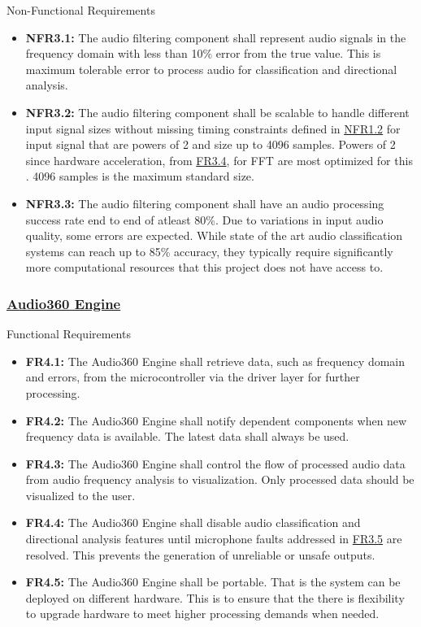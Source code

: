 \documentclass[12pt]{article}
\theoremstyle{definition}
\begin{document}
Non-Functional Requirements
\begin{itemize}
  \item \label{NFR3_1}\textbf{NFR3.1:} The audio filtering component shall
  represent audio signals in the frequency domain with less than 10\% error from
  the true value. This is maximum tolerable error to process audio for
  classification and directional analysis.
  \item \label{NFR3_2}\textbf{NFR3.2:} The audio filtering component shall be
  scalable to handle different input signal sizes without missing timing
  constraints defined in \hyperref[NFR1_2]{NFR1.2} for input signal that are
  powers of 2 and size up to 4096 samples. Powers of 2 since 
  hardware acceleration, from \hyperref[FR3_4]{FR3.4}, for FFT are most
  optimized for this \cite{CMSIS_DSP_FFT}. 4096 samples is the maximum standard
  size.

  \item \label{NFR3_3}\textbf{NFR3.3:} The audio filtering component shall have
  an audio processing success rate end to end of atleast 80\%.
  Due to variations in input audio quality, some errors are expected.
  While state of the art audio classification systems can reach up to 85\%
  accuracy, they typically require significantly more computational resources
  that this project does not have access to.

\end{itemize}

\subsubsection{\hyperref[comp:audio360Engine]{Audio360 Engine}} Functional
Requirements
\begin{itemize}
  \item \label{FR4_1}\textbf{FR4.1:} The Audio360 Engine shall retrieve data,
  such as frequency domain and errors, from the microcontroller via the driver
  layer for further processing.

  \item \label{FR4_2}\textbf{FR4.2:} The Audio360 Engine shall notify dependent
  components when new frequency data is available. The latest data shall always
  be used.

  \item \label{FR4_3}\textbf{FR4.3:} The Audio360 Engine shall control the flow
  of processed audio data from audio frequency analysis to visualization.
  Only processed data should be visualized to the user.

  \item \label{FR4_4}\textbf{FR4.4:} The Audio360 Engine shall disable audio
  classification and directional analysis features until microphone faults
  addressed in \hyperref[FR3_5]{FR3.5} are resolved. This prevents the
  generation of unreliable or unsafe outputs.

  \item \label{FR4_5}\textbf{FR4.5:} The Audio360 Engine shall be portable. That
  is the system can be deployed on different hardware. This is to ensure that
  the there is flexibility to upgrade hardware to meet higher processing demands
  when needed.
\end{itemize}
\end{document}

